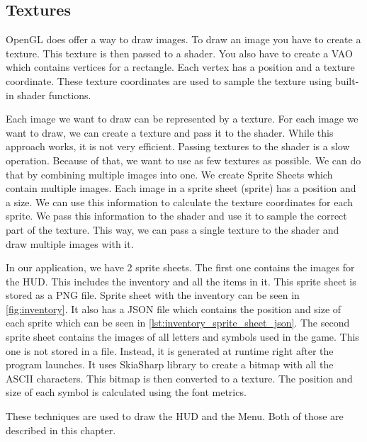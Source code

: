 \subsection{Textures} \label{sec:textures}
OpenGL does offer a way to draw images.
To draw an image you have to create a texture.
This texture is then passed to a shader.
You also have to create a VAO which contains vertices for a rectangle.
Each vertex has a position and a texture coordinate.
These texture coordinates are used to sample the texture using built-in shader functions.

Each image we want to draw can be represented by a texture.
For each image we want to draw, we can create a texture and pass it to the shader.
While this approach works, it is not very efficient.
Passing textures to the shader is a slow operation.
Because of that, we want to use as few textures as possible.
We can do that by combining multiple images into one.
We create Sprite Sheets which contain multiple images.
Each image in a sprite sheet (sprite) has a position and a size.
We can use this information to calculate the texture coordinates for each sprite.
We pass this information to the shader and use it to sample the correct part of the texture.
This way, we can pass a single texture to the shader and draw multiple images with it.

In our application, we have 2 sprite sheets.
The first one contains the images for the HUD.
This includes the inventory and all the items in it.
This sprite sheet is stored as a PNG file.
Sprite sheet with the inventory can be seen in \autoref{fig:inventory}.
It also has a JSON file which contains the position and size of each sprite which can be seen in \autoref{lst:inventory_sprite_sheet_json}.
The second sprite sheet contains the images of all letters and symbols used in the game.
This one is not stored in a file.
Instead, it is generated at runtime right after the program launches.
It uses SkiaSharp library to create a bitmap with all the ASCII characters.
This bitmap is then converted to a texture.
The position and size of each symbol is calculated using the font metrics.

These techniques are used to draw the HUD and the Menu.
Both of those are described in this chapter.

